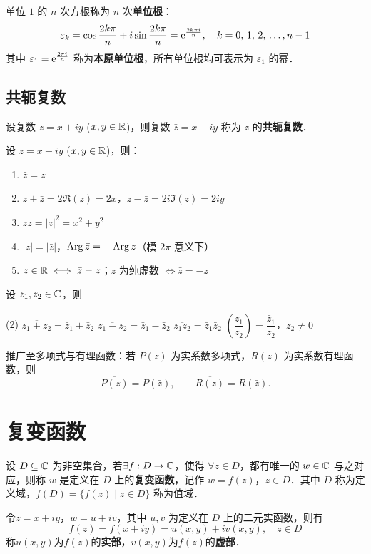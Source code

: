 \documentclass[12pt, a4paper, oneside, UTF8]{ctexbook}
\begin{document}
\begin{definition}[单位根]
单位 $1$ 的 $n$ 次方根称为 $n$ 次\textbf{单位根}：
\[
\varepsilon_k = \cos\frac{2k\pi}{n} + i\sin\frac{2k\pi}{n} = {\rm e}^{\frac{2k\pi i}{n}}, \quad k = 0,\,1,\,2,\,\dots, n-1
\]
其中 $\varepsilon_1 = {\rm e}^{\frac{2\pi i}{n}}$ 称为\textbf{本原单位根}，所有单位根均可表示为 $\varepsilon_1$ 的幂．
\end{definition}

\subsection{共轭复数}
\begin{definition}[共轭复数]
设复数 $z = x + iy$ ($x, y \in \mathbb{R}$)，则复数 $\bar{z} = x - iy$ 称为 $z$ 的\textbf{共轭复数}．
\end{definition}

\begin{theorem}[共轭复数的基本性质]
设 $z = x + iy$ ($x, y \in \mathbb{R}$)，则：
\begin{enumerate}[label=\Roman*.]
    \item $\bar{\bar{z}} = z$
    \item $z + \bar{z} = 2\Re(z) = 2x$，$z - \bar{z} = 2i\Im(z) = 2iy$
    \item $z\bar{z} = |z|^2 = x^2 + y^2$
    \item $|z| = |\bar{z}|$，$\operatorname{Arg}\bar{z} = -\operatorname{Arg} z$（模 $2\pi$ 意义下）
    \item $z \in \mathbb{R} \iff \bar{z} = z$；$z$ 为纯虚数 $\iff \bar{z} = -z$
\end{enumerate}
\end{theorem}

\begin{theorem}[有理运算的共轭性质]
设 $z_1, z_2 \in \mathbb{C}$，则
\begin{tasks}[label-width=1.5em, label=\Roman*.](2)
    \task $\overline{z_1 + z_2} = \bar{z}_1 + \bar{z}_2$
    \task $\overline{z_1 - z_2} = \bar{z}_1 - \bar{z}_2$
    \task $\overline{z_1 z_2} = \bar{z}_1 \bar{z}_2$
    \task $\overline{\left(\dfrac{z_1}{z_2}\right)} = \dfrac{\bar{z}_1}{\bar{z}_2}$，$z_2 \neq 0$

\end{tasks}
推广至多项式与有理函数：若 $P(z)$ 为实系数多项式，$R(z)$ 为实系数有理函数，则
\[
\overline{P(z)} = P(\bar{z}), \qquad \overline{R(z)} = R(\bar{z}).
\]
\end{theorem}

\section{复变函数}
\begin{definition}[复变函数]
设 $D \subseteq \mathbb{C}$ 为非空集合，若$\exists f:D\rightarrow \mathbb{C}$，使得 $\forall z \in D$，都有唯一的 $w \in \mathbb{C}$ 与之对应，则称 $w$ 是定义在 $D$ 上的\textbf{复变函数}，记作 $w = f(z)$，$z \in D$．其中 $D$ 称为定义域，$f(D) = \{f(z) \mid z \in D\}$ 称为值域．

令$z=x+iy$，$w=u+iv$，其中 $u, v$ 为定义在 $D$ 上的二元实函数，则有
\[f(z) = f(x + iy) = u(x,y) + iv(x,y), \quad z \in D\]
称$u(x,y)$为$f(z)$的\textbf{实部}，$v(x,y)$为$f(z)$的\textbf{虚部}．
\end{definition}
\end{document}
